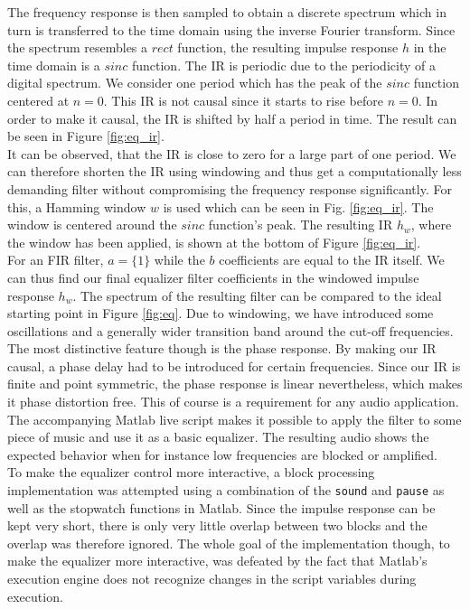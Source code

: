 \documentclass[journal]{IEEEtran}
\begin{document}
The frequency response is then sampled to obtain a discrete spectrum which in turn is transferred to the time domain using the inverse Fourier transform. Since the spectrum resembles a $rect$ function, the resulting impulse response $h$ in the time domain is a $sinc$ function. The IR is periodic due to the periodicity of a digital spectrum. We consider one period which has the peak of the $sinc$ function centered at $n=0$. This IR is not causal since it starts to rise before $n=0$. In order to make it causal, the IR is shifted by half a period in time. The result can be seen in Figure \ref{fig:eq_ir}. \\
\newline
It can be observed, that the IR is close to zero for a large part of one period. We can therefore shorten the IR using windowing and thus get a computationally less demanding filter without compromising the frequency response significantly. For this, a Hamming window $w$ is used which can be seen in Fig. \ref{fig:eq_ir}. The window is centered around the $sinc$ function's peak. The resulting IR $h_w$, where the window has been applied, is shown at the bottom of Figure \ref{fig:eq_ir}.\\
\newline
For an FIR filter, $a = \{1\}$ while the $b$ coefficients are equal to the IR itself. We can thus find our final equalizer filter coefficients in the windowed impulse response $h_w$. The spectrum of the resulting filter can be compared to the ideal starting point in Figure \ref{fig:eq}. Due to windowing, we have introduced some oscillations and a generally wider transition band around the cut-off frequencies. The most distinctive feature though is the phase response. By making our IR causal, a phase delay had to be introduced for certain frequencies. Since our IR is finite and point symmetric, the phase response is linear nevertheless, which makes it phase distortion free. This of course is a requirement for any audio application. \\
\newline
The accompanying Matlab live script makes it possible to apply the filter to some piece of music and use it as a basic equalizer. The resulting audio shows the expected behavior when for instance low frequencies are blocked or amplified. \\
\newline
To make the equalizer control more interactive, a block processing implementation was attempted using a combination of the \texttt{sound} and \texttt{pause} as well as the stopwatch functions in Matlab. Since the impulse response can be kept very short, there is only very little overlap between two blocks and the overlap was therefore ignored. The whole goal of the implementation though, to make the equalizer more interactive, was defeated by the fact that Matlab's execution engine does not recognize changes in the script variables during execution. \\
\end{document}
